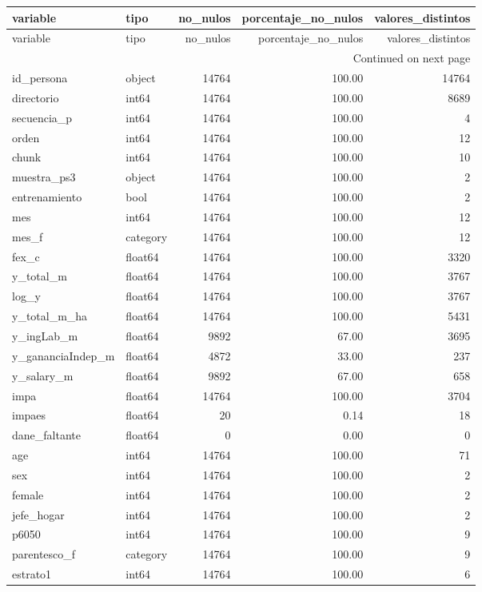 \begin{longtable}{llrrr}
\toprule
variable & tipo & no\_nulos & porcentaje\_no\_nulos & valores\_distintos \\
\midrule
\endfirsthead
\toprule
variable & tipo & no\_nulos & porcentaje\_no\_nulos & valores\_distintos \\
\midrule
\endhead
\midrule
\multicolumn{5}{r}{Continued on next page} \\
\midrule
\endfoot
\bottomrule
\endlastfoot
id\_persona & object & 14764 & 100.00 & 14764 \\
directorio & int64 & 14764 & 100.00 & 8689 \\
secuencia\_p & int64 & 14764 & 100.00 & 4 \\
orden & int64 & 14764 & 100.00 & 12 \\
chunk & int64 & 14764 & 100.00 & 10 \\
muestra\_ps3 & object & 14764 & 100.00 & 2 \\
entrenamiento & bool & 14764 & 100.00 & 2 \\
mes & int64 & 14764 & 100.00 & 12 \\
mes\_f & category & 14764 & 100.00 & 12 \\
fex\_c & float64 & 14764 & 100.00 & 3320 \\
y\_total\_m & float64 & 14764 & 100.00 & 3767 \\
log\_y & float64 & 14764 & 100.00 & 3767 \\
y\_total\_m\_ha & float64 & 14764 & 100.00 & 5431 \\
y\_ingLab\_m & float64 & 9892 & 67.00 & 3695 \\
y\_gananciaIndep\_m & float64 & 4872 & 33.00 & 237 \\
y\_salary\_m & float64 & 9892 & 67.00 & 658 \\
impa & float64 & 14764 & 100.00 & 3704 \\
impaes & float64 & 20 & 0.14 & 18 \\
dane\_faltante & float64 & 0 & 0.00 & 0 \\
age & int64 & 14764 & 100.00 & 71 \\
sex & int64 & 14764 & 100.00 & 2 \\
female & int64 & 14764 & 100.00 & 2 \\
jefe\_hogar & int64 & 14764 & 100.00 & 2 \\
p6050 & int64 & 14764 & 100.00 & 9 \\
parentesco\_f & category & 14764 & 100.00 & 9 \\
estrato1 & int64 & 14764 & 100.00 & 6 \\

\end{longtable}
